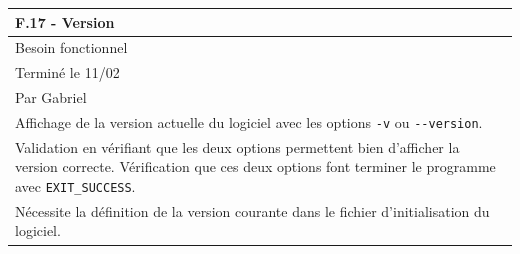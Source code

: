 \documentclass[a4paper,12pt]{article}
\begin{document}
\noindent
\setlength{\arrayrulewidth}{1.5pt}
\renewcommand{\arraystretch}{1.5}
\begin{tabularx}{\textwidth}{|X|}
    \hline
    \textbf{F.17 - Version}                                                                                   \\
    \hline
    Besoin fonctionnel                                                                                        \\
    \hline
    Terminé le 11/02                                                                                          \\
    Par Gabriel                                                                                               \\
    \hline
    Affichage de la version actuelle du logiciel avec les options \texttt{-v} ou \texttt{-}\texttt{-version}. \\
    \arrayrulecolor{MediumAquamarine}\hline
    \arrayrulecolor{CornflowerBlue}
    Validation en vérifiant que les deux options permettent bien d’afficher la version correcte.
    Vérification que ces deux options font terminer le programme avec \texttt{EXIT\_SUCCESS}.                 \\
    \arrayrulecolor{MediumAquamarine}\hline
    \arrayrulecolor{CornflowerBlue}
    Nécessite la définition de la version courante dans le fichier d’initialisation du logiciel.              \\
    \hline
\end{tabularx}

\vspace{1cm}
\end{document}
